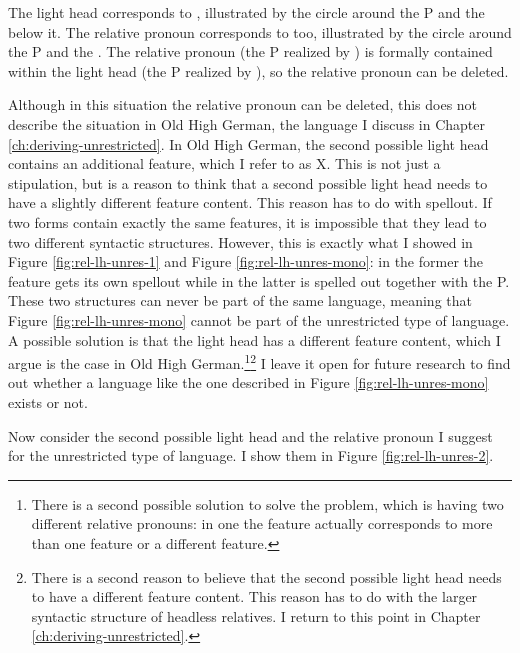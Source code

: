 The light head corresponds to , illustrated by the circle around the P and the  below it. The relative pronoun corresponds to  too, illustrated by the circle around the P and the . The relative pronoun (the P realized by ) is formally contained within the light head (the P realized by ), so the relative pronoun can be deleted.

Although in this situation the relative pronoun can be deleted, this does not describe the situation in Old High German, the language I discuss in Chapter \ref{ch:deriving-unrestricted}. In Old High German, the second possible light head contains an additional feature, which I refer to as X.
This is not just a stipulation, but is a reason to think that a second possible light head needs to have a slightly different feature content. This reason has to do with spellout. If two forms contain exactly the same features, it is impossible that they lead to two different syntactic structures. However, this is exactly what I showed in Figure \ref{fig:rel-lh-unres-1} and Figure \ref{fig:rel-lh-unres-mono}: in the former the feature  gets its own spellout while in the latter  is spelled out together with the P. These two structures can never be part of the same language, meaning that Figure \ref{fig:rel-lh-unres-mono} cannot be part of the unrestricted type of language. A possible solution is that the light head has a different feature content, which I argue is the case in Old High German.\footnote{
There is a second possible solution to solve the problem, which is having two different relative pronouns: in one the feature  actually corresponds to more than one feature or a different feature.
}\footnote{
There is a second reason to believe that the second possible light head needs to have a different feature content. This reason has to do with the larger syntactic structure of headless relatives. I return to this point in Chapter \ref{ch:deriving-unrestricted}.
}
I leave it open for future research to find out whether a language like the one described in Figure \ref{fig:rel-lh-unres-mono} exists or not.

Now consider the second possible light head and the relative pronoun I suggest for the unrestricted type of language. I show them in Figure \ref{fig:rel-lh-unres-2}.


